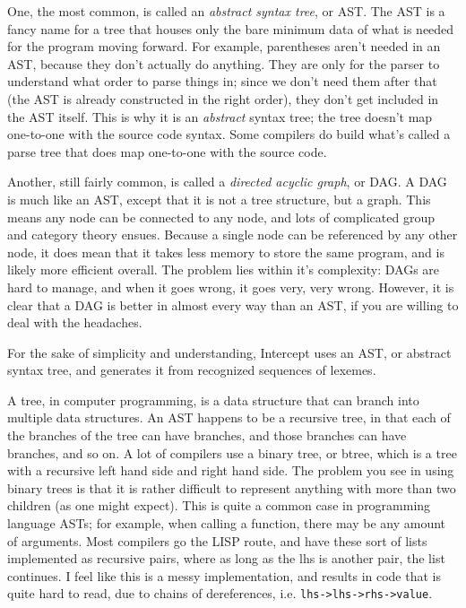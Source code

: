 \documentclass[
12pt,
letterpaper,
oneside,
]{memoir}
\newcommand{\lang}{Intercept
}
\begin{document}
One, the most common, is called an \emph{abstract syntax tree}, or AST. The AST is a fancy name for a tree that houses only the bare minimum data of what is needed for the program moving forward. For example, parentheses aren't needed in an AST, because they don't actually do anything. They are only for the parser to understand what order to parse things in; since we don't need them after that (the AST is already constructed in the right order), they don't get included in the AST itself. This is why it is an \emph{abstract} syntax tree; the tree doesn't map one-to-one with the source code syntax. Some compilers do build what's called a parse tree that does map one-to-one with the source code.

Another, still fairly common, is called a \emph{directed acyclic graph}, or DAG. A DAG is much like an AST, except that it is not a tree structure, but a graph. This means any node can be connected to any node, and lots of complicated group and category theory ensues. Because a single node can be referenced by any other node, it does mean that it takes less memory to store the same program, and is likely more efficient overall. The problem lies within it's complexity: DAGs are hard to manage, and when it goes wrong, it goes very, very wrong. However, it is clear that a DAG is better in almost every way than an AST, if you are willing to deal with the headaches.

For the sake of simplicity and understanding, \lang uses an AST, or abstract syntax tree, and generates it from recognized sequences of lexemes.

A tree, in computer programming, is a data structure that can branch into multiple data structures. An AST happens to be a recursive tree, in that each of the branches of the tree can have branches, and those branches can have branches, and so on. A lot of compilers use a binary tree, or btree, which is a tree with a recursive left hand side and right hand side. The problem you see in using binary trees is that it is rather difficult to represent anything with more than two children (as one might expect). This is quite a common case in programming language ASTs; for example, when calling a function, there may be any amount of arguments. Most compilers go the LISP route, and have these sort of lists implemented as recursive pairs, where as long as the lhs is another pair, the list continues. I feel like this is a messy implementation, and results in code that is quite hard to read, due to chains of dereferences, i.e. \verb|lhs->lhs->rhs->value|.
\end{document}
